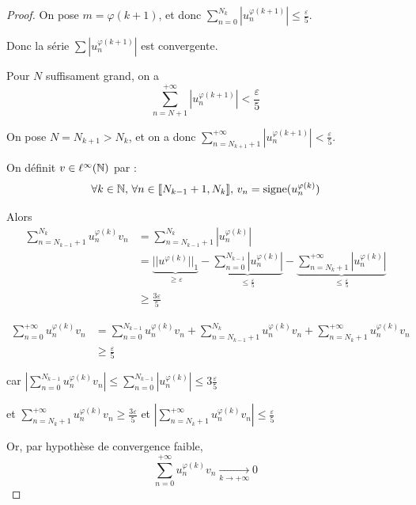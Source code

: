 \begin{proof}
    On pose $m = \varphi(k + 1)$, et donc $\sum_{n = 0 }^{N_k} |u_n^{\varphi(k + 1)}| \leqslant \frac{\varepsilon}{5}$.

    Donc la série $\sum |u_n^{\varphi(k + 1)}|$ est convergente. 

    Pour $N$ suffisament grand, on a
    \[\sum_{n = N + 1}^{+\infty} |u_n^{\varphi(k + 1)}| < \frac{\varepsilon}{5}\]

    On pose $N = N_{k + 1} > N_k$, et on a donc $\sum_{n = N_{k + 1} + 1}^{+\infty} |u_n^{\varphi(k + 1)}| < \frac{\varepsilon}{5}$.


    \svspace On définit $v \in \ell^\infty(\mathbb{N})$ par : 
    \[ \forall k \in \mathbb{N}, \, \forall n \in [\![N_{k -1} + 1, N_k]\!], \, v_n = \text{signe}(u_n^{\varphi(k)}) \]

    Alors 
    \begin{align}
        \sum_{n = N_{k - 1} + 1}^{N_k} u_n^{\varphi(k)} v_n & = \sum_{n = N_{k - 1} + 1}^{N_k} |u_n^{\varphi(k)}| \\
        & = \underbrace{||u^{\varphi(k)}||_1}_{\geqslant \varepsilon} - \underbrace{\sum_{n = 0}^{N_{k - 1}} |u_n^{\varphi(k)}|}_{\leqslant \frac \varepsilon 5} - \underbrace{\sum_{n = N_k + 1}^{+\infty} |u_n^{\varphi(k)}|}_{\leqslant \frac \varepsilon 5} \\
        & \geqslant \frac{3 \varepsilon}{5}
    \end{align}


    \svspace \begin{align}
        \sum_{n = 0}^{+\infty} u_n^{\varphi(k)} v_n & = \sum_{n = 0}^{N_{k - 1}} u_n^{\varphi(k)} v_n + \sum_{n = N_{k - 1} + 1}^{N_k} u_n^{\varphi(k)} v_n + \sum_{n = N_k + 1}^{+\infty} u_n^{\varphi(k)} v_n \\
        & \geqslant \frac \varepsilon 5 
    \end{align}

    car $\displaystyle \left| \sum_{n = 0}^{N_{k - 1}} u_n^{\varphi(k)} v_n \right| \leqslant \sum_{n = 0}^{N_{k - 1}} |u_n^{\varphi(k)}| \leqslant 3 \frac \varepsilon 5$

    et $\displaystyle \sum_{n = N_k + 1}^{+\infty} u_n^{\varphi(k)} v_n \geqslant \frac{3 \varepsilon}{5}$ et 
    $\displaystyle \left| \sum_{n = N_k + 1}^{+\infty} u_n^{\varphi(k)} v_n \right| \leqslant \frac \varepsilon 5$


    Or, par hypothèse de convergence faible,
    \[\sum_{n = 0}^{+\infty} u_n^{\varphi(k)} v_n \xrightarrow[k \to + \infty]{} 0\]
\end{proof}